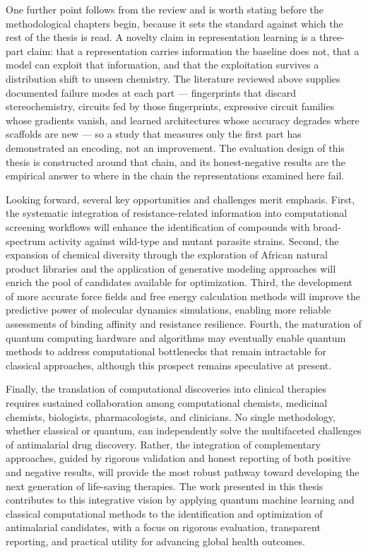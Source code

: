 One further point follows from the review and is worth stating before the methodological chapters begin, because it sets the standard against which the rest of the thesis is read. A novelty claim in representation learning is a three-part claim: that a representation carries information the baseline does not, that a model can exploit that information, and that the exploitation survives a distribution shift to unseen chemistry. The literature reviewed above supplies documented failure modes at each part --- fingerprints that discard stereochemistry, circuits fed by those fingerprints, expressive circuit families whose gradients vanish, and learned architectures whose accuracy degrades where scaffolds are new --- so a study that measures only the first part has demonstrated an encoding, not an improvement. The evaluation design of this thesis is constructed around that chain, and its honest-negative results are the empirical answer to where in the chain the representations examined here fail.

Looking forward, several key opportunities and challenges merit emphasis. First, the systematic integration of resistance-related information into computational screening workflows will enhance the identification of compounds with broad-spectrum activity against wild-type and mutant parasite strains. Second, the expansion of chemical diversity through the exploration of African natural product libraries and the application of generative modeling approaches will enrich the pool of candidates available for optimization. Third, the development of more accurate force fields and free energy calculation methods will improve the predictive power of molecular dynamics simulations, enabling more reliable assessments of binding affinity and resistance resilience. Fourth, the maturation of quantum computing hardware and algorithms may eventually enable quantum methods to address computational bottlenecks that remain intractable for classical approaches, although this prospect remains speculative at present.

Finally, the translation of computational discoveries into clinical therapies requires sustained collaboration among computational chemists, medicinal chemists, biologists, pharmacologists, and clinicians. No single methodology, whether classical or quantum, can independently solve the multifaceted challenges of antimalarial drug discovery. Rather, the integration of complementary approaches, guided by rigorous validation and honest reporting of both positive and negative results, will provide the most robust pathway toward developing the next generation of life-saving therapies. The work presented in this thesis contributes to this integrative vision by applying quantum machine learning and classical computational methods to the identification and optimization of antimalarial candidates, with a focus on rigorous evaluation, transparent reporting, and practical utility for advancing global health outcomes.


